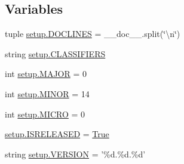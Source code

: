 \subsection*{Variables}
\begin{DoxyCompactItemize}
\item 
tuple \hyperlink{namespacesetup_a7db17fdfb5ba2ad6ec8cb0d9ec1d0022}{setup.\+D\+O\+C\+L\+I\+N\+E\+S} = \+\_\+\+\_\+doc\+\_\+\+\_\+.\+split(\char`\"{}\textbackslash{}n\char`\"{})
\item 
string \hyperlink{namespacesetup_a8c2c0b795c98fb0a8ac57c19056f9884}{setup.\+C\+L\+A\+S\+S\+I\+F\+I\+E\+R\+S}
\item 
int \hyperlink{namespacesetup_aabdd3405fc4bddb50f7d4668a2d28fee}{setup.\+M\+A\+J\+O\+R} = 0
\item 
int \hyperlink{namespacesetup_af57aa6b596b66db2a38a93ed9e01fff7}{setup.\+M\+I\+N\+O\+R} = 14
\item 
int \hyperlink{namespacesetup_aacdfc8a41c1182b303bbc1ec09fae22f}{setup.\+M\+I\+C\+R\+O} = 0
\item 
\hyperlink{namespacesetup_ad7c3133999abca4502291a9bbbb4ef11}{setup.\+I\+S\+R\+E\+L\+E\+A\+S\+E\+D} = \hyperlink{libqhull_8h_add3ca9eefe3b5b754426f51d3043e579}{True}
\item 
string \hyperlink{namespacesetup_a704f2323949f9be057e0a3574731e019}{setup.\+V\+E\+R\+S\+I\+O\+N} = '\%d.\%d.\%d'
\end{DoxyCompactItemize}
